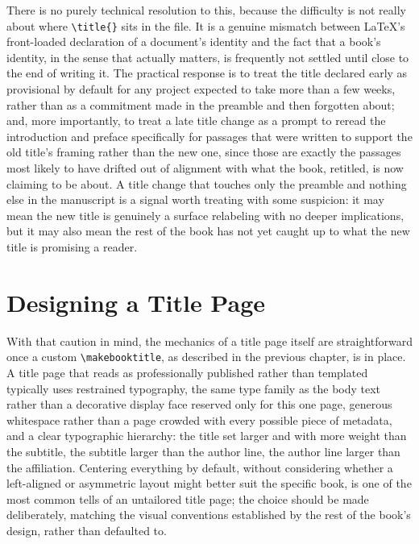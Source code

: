 There is no purely technical resolution to this, because the difficulty is not really about where \texttt{\textbackslash{}title\{\}} sits in the file. It is a genuine mismatch between LaTeX's front-loaded declaration of a document's identity and the fact that a book's identity, in the sense that actually matters, is frequently not settled until close to the end of writing it. The practical response is to treat the title declared early as provisional by default for any project expected to take more than a few weeks, rather than as a commitment made in the preamble and then forgotten about; and, more importantly, to treat a late title change as a prompt to reread the introduction and preface specifically for passages that were written to support the old title's framing rather than the new one, since those are exactly the passages most likely to have drifted out of alignment with what the book, retitled, is now claiming to be about. A title change that touches only the preamble and nothing else in the manuscript is a signal worth treating with some suspicion: it may mean the new title is genuinely a surface relabeling with no deeper implications, but it may also mean the rest of the book has not yet caught up to what the new title is promising a reader.

\hypertarget{designing-a-title-page}{%
\section{Designing a Title Page}\label{designing-a-title-page}}

With that caution in mind, the mechanics of a title page itself are straightforward once a custom \texttt{\textbackslash{}makebooktitle}, as described in the previous chapter, is in place. A title page that reads as professionally published rather than templated typically uses restrained typography, the same type family as the body text rather than a decorative display face reserved only for this one page, generous whitespace rather than a page crowded with every possible piece of metadata, and a clear typographic hierarchy: the title set larger and with more weight than the subtitle, the subtitle larger than the author line, the author line larger than the affiliation. Centering everything by default, without considering whether a left-aligned or asymmetric layout might better suit the specific book, is one of the most common tells of an untailored title page; the choice should be made deliberately, matching the visual conventions established by the rest of the book's design, rather than defaulted to.

